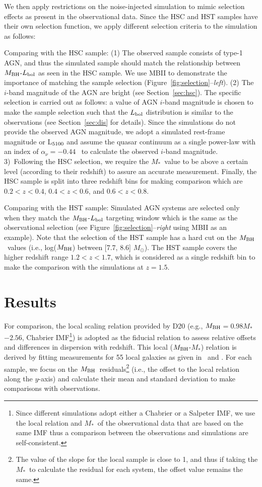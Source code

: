 \documentclass[twocolumn]{aastex631}
\def\smass{{$M_*$}}
\def\mbh{$M_{\rm BH}$}
\begin{document}
We then apply restrictions on the noise-injected simulation to mimic selection effects as present in the observational data. Since the HSC and HST samples have their own selection function, we apply different selection criteria to the simulation as follows:

Comparing with the HSC sample: (1) The observed sample consists of type-1 AGN, and thus the simulated sample should match the relationship between \mbh-$L_{\rm bol}$ as seen in the HSC sample. We use MBII to demonstrate the importance of matching the sample selection (Figure~\ref{fig:selection}--{\it left}). (2) The $i$-band magnitude of the AGN are bright (see Section~\ref{sec:hsc}). 
The specific selection is carried out as follows: a value of AGN $i$-band magnitude is chosen to make the sample selection such that the $L_{\rm bol}$ distribution is similar to the observations (see Section~\ref{sec:dis} for details).
Since the simulations do not provide the observed AGN magnitude, we adopt a simulated rest-frame magnitude or L$_{\rm 5100}$ and assume the quasar continuum as a single power-law with an index of $\alpha_\nu=-0.44$~\citep{2001AJ....122..549V} to calculate the observed $i$-band magnitude.
 3)~Following the HSC selection, we require the \smass\ value to be above a certain level (according to their redshift) to assure an accurate measurement. Finally, the HSC sample is split into three redshift bins for making comparison which are $0.2<z<0.4$, $0.4<z<0.6$, and $0.6<z<0.8$.
 
Comparing with the HST sample: Simulated AGN systems are selected only when they match the  \mbh-$L_{\rm bol}$ targeting window which is the same as the observational selection (see Figure~\ref{fig:selection}--{\it right} using MBII as an example). Note that the selection of the HST sample has a hard cut on the \mbh\ values (i.e., log(\mbh) between [7.7, 8.6] $M_{\odot}$). The HST sample covers the higher redshift range $1.2<z<1.7$, which is considered as a single redshift bin to make the comparison with the simulations at $z=1.5$.



\section{Results} \label{sec:result}
For comparison, the local scaling relation provided by  D20 (e.g., \mbh$=0.98$\smass$-2.56$, Chabrier IMF\footnote{Since different simulations adopt either a Chabrier or a Salpeter IMF, we use the local relation and \smass\ of the observational data that are based on the same IMF thus a comparison between the observations and simulations are self-consistent.}) is adopted as the fiducial relation to assess relative offsets and differences in dispersion with redshift. This local (\mbh-\smass) relation is derived by fitting measurements for 55 local galaxies as given in~\citet{Bennert++2011} and \citet{H+R04}.
For each sample, we focus on the \mbh\ residuals\footnote{The value of the slope for the local sample is close to 1, and thus if taking the \smass\ to calculate the residual for each system, the offset value remains the same.} (i.e., the offset to the local relation along the $y$-axis) and calculate their mean and standard deviation to make comparisons with observations.
\end{document}
